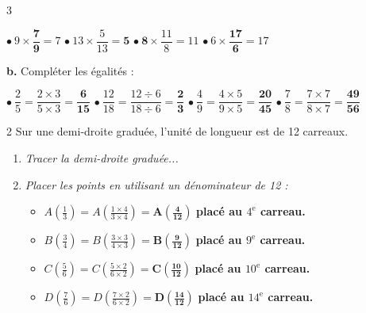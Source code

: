 \documentclass[a4paper]{book}
\begin{document}
{\begin{exerciceNote}{3}
\begin{minipage}[t]{0.46\textwidth}
            $\bullet~9 \times \mathbf{\dfrac{7}{9}} = 7$ \hspace{1.5cm} $\bullet~13 \times \dfrac{5}{13} = \mathbf{5}$
            \vspace{0.4cm} \newline
            $\bullet~\mathbf{8} \times \dfrac{11}{8} = 11$ \hspace{1.2cm} $\bullet~6 \times \mathbf{\dfrac{17}{6}} = 17$
        \end{minipage}
        \hfill\vrule\hfill 
        \begin{minipage}[t]{0.46\textwidth}
            \textbf{b.} Compléter les égalités : \newline
            
            $\bullet~\dfrac{2}{5} = \dfrac{2 \times 3}{5 \times 3} = \mathbf{\dfrac{6}{15}}$ \hspace{1.2cm} $\bullet~\dfrac{12}{18} = \dfrac{12 \div 6}{18 \div 6} = \mathbf{\dfrac{2}{3}}$
            \vspace{0.4cm} \newline
            $\bullet~\dfrac{4}{9} = \dfrac{4 \times 5}{9 \times 5} = \mathbf{\dfrac{20}{45}}$ \hspace{1.2cm} $\bullet~\dfrac{7}{8} = \dfrac{7 \times 7}{8 \times 7} = \mathbf{\dfrac{49}{56}}$
        \end{minipage}
    \end{exerciceNote}

        
    \begin{exerciceNote}{2}
        Sur une demi-droite graduée, l'unité de longueur est de 12 carreaux.
        \begin{enumerate}
            \item \textit{Tracer la demi-droite graduée...}
            \item \textit{Placer les points en utilisant un dénominateur de 12 :}
            \begin{itemize}
                \item $A\left(\frac{1}{3}\right) = A\left(\frac{1 \times 4}{3 \times 4}\right) = \mathbf{A\left(\frac{4}{12}\right)}$ \textrightarrow{} \textbf{placé au $4^{\text{e}}$ carreau.}
                \item $B\left(\frac{3}{4}\right) = B\left(\frac{3 \times 3}{4 \times 3}\right) = \mathbf{B\left(\frac{9}{12}\right)}$ \textrightarrow{} \textbf{placé au $9^{\text{e}}$ carreau.}
                \item $C\left(\frac{5}{6}\right) = C\left(\frac{5 \times 2}{6 \times 2}\right) = \mathbf{C\left(\frac{10}{12}\right)}$ \textrightarrow{} \textbf{placé au $10^{\text{e}}$ carreau.}
                \item $D\left(\frac{7}{6}\right) = D\left(\frac{7 \times 2}{6 \times 2}\right) = \mathbf{D\left(\frac{14}{12}\right)}$ \textrightarrow{} \textbf{placé au $14^{\text{e}}$ carreau.}
            \end{itemize}
            

\end{enumerate}
\end{exerciceNote}}
\end{document}
